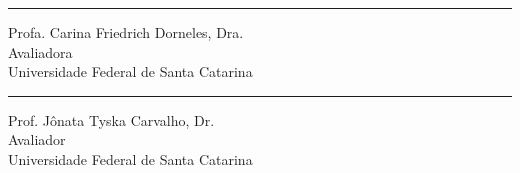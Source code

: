 \documentclass[
  12pt,
  oneside,
  a4paper,
  chapter=TITLE,
  section=TITLE,
  english,
  brazil,
]{abntex2}
\newcommand\blankpage{%
  \null
  \thispagestyle{empty}%
  \addtocounter{page}{-1}%
\newpage}
\begin{document}
\begin{folhadeaprovacao}
\begin{center}
    \vspace{1.5\onelineskip}

    \rule{6cm}{1pt}

    Profa. Carina Friedrich Dorneles, Dra.\\
    Avaliadora\\
    Universidade Federal de Santa Catarina

    \vspace{1.5\onelineskip}

    \rule{6cm}{1pt}

    Prof. Jônata Tyska Carvalho, Dr.\\
    Avaliador\\
    Universidade Federal de Santa Catarina

  \end{center}
\end{folhadeaprovacao}

\afterpage{\blankpage}

\end{document}
